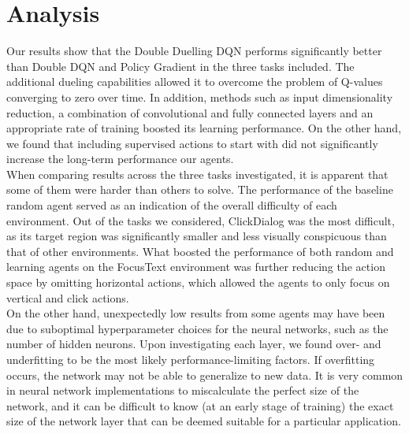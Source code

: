 \documentclass[10pt,journal,compsoc]{IEEEtran}
\begin{document}
\section{Analysis}
Our results show that the Double Duelling DQN performs significantly better than Double DQN and Policy Gradient in the three tasks included. The additional dueling capabilities allowed it to overcome the problem of Q-values converging to zero over time. In addition, methods such as input dimensionality reduction, a combination of convolutional and fully connected layers and an appropriate rate of training boosted its learning performance. On the other hand, we found that including supervised actions to start with did not significantly increase the long-term performance our agents. \\

When comparing results across the three tasks investigated, it is apparent that some of them were harder than others to solve. The performance of the baseline random agent served as an indication of the overall difficulty of each environment. Out of the tasks we considered, ClickDialog was the most difficult, as its target region was significantly smaller and less visually conspicuous than that of other environments. What boosted the performance of both random and learning agents on the FocusText environment was further reducing the action space by omitting horizontal actions, which allowed the agents to only focus on vertical and click actions. \\

On the other hand, unexpectedly low results from some agents may have been due to suboptimal hyperparameter choices for the neural networks, such as the number of hidden neurons. Upon investigating each layer, we found over- and underfitting to be the most likely performance-limiting factors. If overfitting occurs, the network may not be able to generalize to new data. It is very common in neural network implementations to miscalculate the perfect size of the network, and it can be difficult to know (at an early stage of training) the exact size of the network layer that can be deemed suitable for a particular application.
\end{document}

